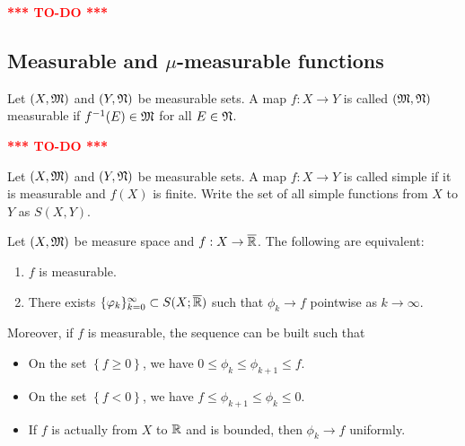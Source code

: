 \documentclass[a4paper]{article}
\newcommand{\TODO}{\textcolor{red}{\textbf{*** TO-DO ***}}}
\renewcommand{\seqinfk}[1]{\{ #1 \}_{k=0}^\infty}
\begin{document}
\TODO

\subsection{Measurable and $\mu$-measurable functions}

\begin{defi}
  Let $(X, \mathfrak{M})$ and $(Y, \mathfrak{N})$ be measurable sets. A map
  $f : X \to Y$ is called $(\mathfrak{M}, \mathfrak{N})$ measurable if $f^{-1}(E)
    \in \mathfrak{M}$ for all $E \in \mathfrak{N}$.
\end{defi}

\TODO

\begin{defi}
  Let $(X, \mathfrak{M})$ and $(Y, \mathfrak{N})$ be measurable sets. A map
  $f : X \to Y$ is called simple if it is
  measurable and $f(X)$ is finite. Write the set of all
  simple functions from $X$ to $Y$ as
  $S(X, Y)$.
\end{defi}

\begin{thm}
  Let $(X, \mathfrak{M})$ be measure space and $f : X \to \overline{\mathbb{R}}$. The
  following are equivalent:
  \begin{enumerate}
    \item $f$ is measurable.
    \item There exists $\seqinfk{\phi_k} \subset S(X; \bar{\R})$ such that
          $\phi_k \to f$ pointwise as $k \to \infty$.
  \end{enumerate}
  Moreover, if $f$ is measurable, the sequence can be built such that
  \begin{itemize}
    \item On the set $\left\{ f \geq 0 \right\}$, we have $0 \leq \phi_k
          \leq \phi_{k+1} \leq f$.
    \item On the set $\left\{ f < 0 \right\}$, we have $f \leq \phi_{k+1}
          \leq \phi_k \leq 0$.
    \item If $f$ is actually from $X$ to $\mathbb{R}$ and is bounded, then $\phi_k
          \to f$ uniformly.
  \end{itemize}
\end{thm}
\end{document}
